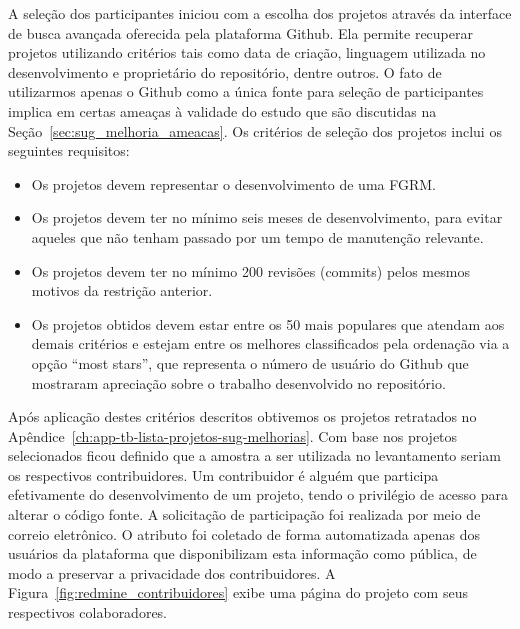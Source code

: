A seleção dos participantes iniciou com a escolha dos projetos através da
interface de busca avançada oferecida pela plataforma Github. Ela permite
recuperar projetos utilizando critérios tais como data de criação, linguagem
utilizada no desenvolvimento e proprietário do repositório, dentre outros. O
fato de utilizarmos apenas o Github como a única fonte para seleção de
participantes implica em certas ameaças à validade do estudo que são discutidas
na Seção~\ref{sec:sug_melhoria_ameacas}. Os critérios de seleção dos projetos
inclui os seguintes requisitos:

\begin{itemize}
	\item Os projetos devem representar o desenvolvimento de uma FGRM\@.
    \item Os projetos devem ter no mínimo seis meses de desenvolvimento, para
        evitar aqueles que não tenham passado por um tempo de manutenção
        relevante.
	\item Os projetos devem  ter  no  mínimo  200  revisões (commits)  pelos
		mesmos motivos  da restrição anterior.
    \item Os projetos obtidos devem estar entre os 50 mais populares que atendam
        aos demais critérios e estejam entre os melhores classificados pela
        ordenação via a opção ``most stars'', que representa o número de usuário
        do Github que mostraram apreciação sobre o trabalho desenvolvido no
        repositório.
\end{itemize}

Após aplicação destes critérios descritos obtivemos os projetos retratados no
Apêndice~\ref{ch:app-tb-lista-projetos-sug-melhorias}. Com base nos projetos
selecionados ficou definido que a amostra a ser utilizada no levantamento seriam
os respectivos contribuidores. Um contribuidor é alguém que participa
efetivamente do desenvolvimento de um projeto, tendo o privilégio de acesso para
alterar o código fonte. A solicitação de participação foi realizada por meio de
correio eletrônico. O atributo foi coletado de forma automatizada apenas dos
usuários da plataforma que disponibilizam esta informação como pública, de modo
a preservar a privacidade dos contribuidores. A
Figura~\ref{fig:redmine_contribuidores} exibe uma página do projeto com seus
respectivos colaboradores.

